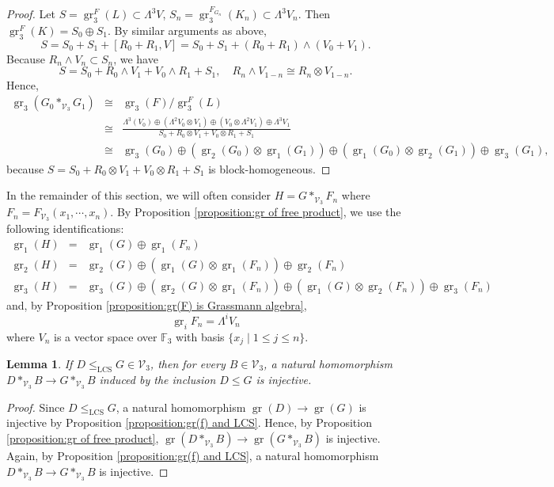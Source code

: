 \documentclass[11pt,reqno]{article}
\newtheorem{lemma}[theorem]{Lemma}
\theoremstyle{definition}
\theoremstyle{remark}
\DeclareMathOperator{\gr}{gr}
\newcommand{\LCS}{\mathrm{LCS}}
\begin{document}
\begin{proof}
Let $S=\gr_3^F(L)\subset \Lambda^3V$, 
$S_n=\gr_3^{F_{G_n}}(K_n)\subset \Lambda^3V_n$.
Then $\gr_3^F(K)=S_0\oplus S_1$.
By similar arguments as above,
\[S=S_0+S_1+[R_0+R_1,V]=S_0+S_1+(R_0+R_1)\wedge(V_0+V_1).\]
Because $R_n\wedge V_n\subset S_n$, we have
\[
    S=S_0+R_0\wedge V_1+V_0\wedge R_1+S_1, \quad R_n\wedge V_{1-n}\cong R_n\otimes V_{1-n}.
\]
Hence,
\begin{eqnarray*}
    \gr_3(G_0*_{\mathcal V_3} G_1) 
    &\cong&
    \gr_3(F)/\gr_3^F(L)\\ 
    &\cong&
    \frac{\Lambda^3(V_0)\oplus(\Lambda^2V_0\otimes V_1) \oplus (V_0\otimes \Lambda^2V_1)\oplus\Lambda^3 V_1}{S_0+R_0\otimes V_1+V_0\otimes R_1 + S_1}\\ 
    &\cong&
    \gr_3(G_0)\oplus (\gr_2(G_0)\otimes \gr_1(G_1))\oplus (\gr_1(G_0)\otimes \gr_2(G_1))\oplus \gr_3(G_1),
\end{eqnarray*}
because $S=S_0+R_0\otimes V_1+V_0\otimes R_1+S_1$ is block-homogeneous.
\end{proof}

In the remainder of this section, we will often consider $H=G*_{\mathcal V_3} F_n$ where $F_n=F_{\mathcal V_3}(x_1,\cdots, x_n)$.
By Proposition \ref{proposition:gr of free product}, we use the following identifications:
    \begin{eqnarray*}
        \gr_1(H)&=& \gr_1(G)\oplus \gr_1(F_n)\\ 
        \gr_2(H) &=& \gr_2(G)\oplus (\gr_1(G)\otimes \gr_1(F_{n})) \oplus \gr_2(F_{n})\\
        \gr_3(H) &=& \gr_3(G)\oplus (\gr_2(G)\otimes \gr_1(F_{n})) \oplus (\gr_1(G)\otimes \gr_2(F_{n})) \oplus \gr_3(F_{n})
    \end{eqnarray*}
    and, by Proposition \ref{proposition:gr(F) is Grassmann algebra},
    \[
        \gr_i F_{n} = \Lambda^i V_n
        \]
    where $V_n$ is a vector space over $\mathbb F_3$ with basis $\{x_j\mid 1\leq j\leq n\}$.



\begin{lemma}\label{lemma:free-product-amalgam}
    If $D\leq_{\LCS}G\in\mathcal V_3$, then for every $B\in\mathcal V_3$,
    a natural homomorphism
    $D*_{\mathcal V_3}B\to G*_{\mathcal V_3}B$ induced by the inclusion
    $D\leq G$ is injective.
\end{lemma}
\begin{proof}
    Since $D\leq_\LCS G$, a natural homomorphism $\gr(D) \to \gr(G)$ is injective by Proposition \ref{proposition:gr(f) and LCS}.
    Hence, by Proposition \ref{proposition:gr of free product}, $\gr(D*_{\mathcal V_3}B) \to \gr(G*_{\mathcal V_3}B)$ is injective.
    Again, by Proposition \ref{proposition:gr(f) and LCS},
    a natural homomorphism
    $D*_{\mathcal V_3}B\to G*_{\mathcal V_3}B$ is injective. 
\end{proof} 
\end{document}
